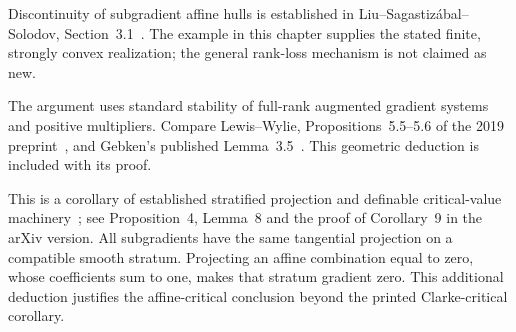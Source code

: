 Discontinuity of subgradient affine hulls is established in Liu--Sagastiz\'abal--Solodov, Section~3.1~\cite{geom_LSS2019}. The example in this chapter supplies the stated finite, strongly convex realization; the general rank-loss mechanism is not claimed as new.

The argument uses standard stability of full-rank augmented gradient systems and positive multipliers. Compare Lewis--Wylie, Propositions~5.5--5.6 of the 2019 preprint~\cite{LW}, and Gebken's published Lemma~3.5~\cite{BG}. This geometric deduction is included with its proof.

This is a corollary of established stratified projection and definable critical-value machinery~\cite{BDLS}; see Proposition~4, Lemma~8 and the proof of Corollary~9 in the arXiv version. All subgradients have the same tangential projection on a compatible smooth stratum. Projecting an affine combination equal to zero, whose coefficients sum to one, makes that stratum gradient zero. This additional deduction justifies the affine-critical conclusion beyond the printed Clarke-critical corollary.
